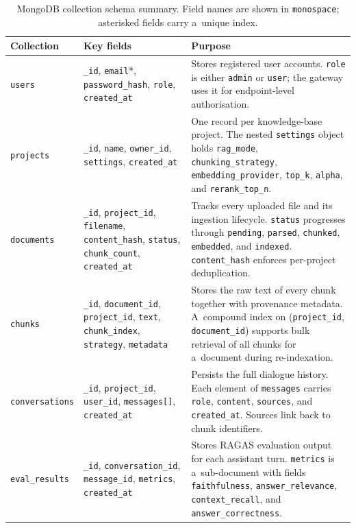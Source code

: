 \begin{table}[htbp]
  \centering
  \caption[MongoDB collection schema summary.]{MongoDB collection schema summary. Field names are shown in
    \texttt{monospace}; asterisked fields carry a~unique index.}
  \label{tab:mongo_collections}
  \begin{tabularx}{\textwidth}{@{}lp{4.2cm}X@{}}
    \toprule
    \textbf{Collection} & \textbf{Key fields} & \textbf{Purpose} \\
    \midrule
    \texttt{users}
      & \texttt{\_id}, \texttt{email}*, \texttt{password\_hash},
        \texttt{role}, \texttt{created\_at}
      & Stores registered user accounts. \texttt{role} is either
        \texttt{admin} or \texttt{user}; the gateway uses it for
        endpoint-level authorisation. \\
    \addlinespace
    \texttt{projects}
      & \texttt{\_id}, \texttt{name}, \texttt{owner\_id},
        \texttt{settings}, \texttt{created\_at}
      & One record per knowledge-base project. The nested
        \texttt{settings} object holds \texttt{rag\_mode},
        \texttt{chunking\_strategy}, \texttt{embedding\_provider},
        \texttt{top\_k}, \texttt{alpha}, and \texttt{rerank\_top\_n}. \\
    \addlinespace
    \texttt{documents}
      & \texttt{\_id}, \texttt{project\_id}, \texttt{filename},
        \texttt{content\_hash}, \texttt{status}, \texttt{chunk\_count},
        \texttt{created\_at}
      & Tracks every uploaded file and its ingestion lifecycle.
        \texttt{status} progresses through \texttt{pending},
        \texttt{parsed}, \texttt{chunked}, \texttt{embedded}, and
        \texttt{indexed}. \texttt{content\_hash} enforces
        per-project deduplication. \\
    \addlinespace
    \texttt{chunks}
      & \texttt{\_id}, \texttt{document\_id}, \texttt{project\_id},
        \texttt{text}, \texttt{chunk\_index}, \texttt{strategy},
        \texttt{metadata}
      & Stores the raw text of every chunk together with provenance
        metadata. A~compound index on (\texttt{project\_id},
        \texttt{document\_id}) supports bulk retrieval of all chunks
        for a~document during re-indexation. \\
    \addlinespace
    \texttt{conversations}
      & \texttt{\_id}, \texttt{project\_id}, \texttt{user\_id},
        \texttt{messages[]}, \texttt{created\_at}
      & Persists the full dialogue history. Each element of
        \texttt{messages} carries \texttt{role}, \texttt{content},
        \texttt{sources}, and \texttt{created\_at}.
        Sources link back to chunk identifiers. \\
    \addlinespace
    \texttt{eval\_results}
      & \texttt{\_id}, \texttt{conversation\_id},
        \texttt{message\_id}, \texttt{metrics}, \texttt{created\_at}
      & Stores RAGAS evaluation output for each assistant turn.
        \texttt{metrics} is a~sub-document with fields
        \texttt{faithfulness}, \texttt{answer\_relevance},
        \texttt{context\_recall}, and \texttt{answer\_correctness}. \\
    \bottomrule
  \end{tabularx}
\end{table}

